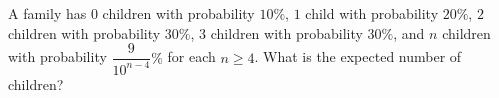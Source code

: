 A family has $0$ children with probability $10\%$, $1$ child with probability $20\%$, $2$ children with probability $30\%$, $3$ children with probability $30\%$, and $n$ children with probability $\dfrac{9}{10^{n-4}}\%$ for each $n\ge4$. What is the expected number of children?
